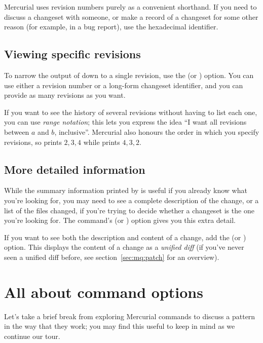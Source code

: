 Mercurial uses revision numbers purely as a convenient shorthand.  If
you need to discuss a changeset with someone, or make a record of a
changeset for some other reason (for example, in a bug report), use
the hexadecimal identifier.

\subsection{Viewing specific revisions}

To narrow the output of  down to a single revision, use the
 (or ) option.  You can use either a
revision number or a long-form changeset identifier, and you can
provide as many revisions as you want.  

If you want to see the history of several revisions without having to
list each one, you can use \emph{range notation}; this lets you
express the idea ``I want all revisions between $a$ and $b$,
inclusive''.
Mercurial also honours the order in which you specify revisions, so
 prints $2,3,4$ while 
prints $4,3,2$.

\subsection{More detailed information}

While the summary information printed by  is useful if you
already know what you're looking for, you may need to see a complete
description of the change, or a list of the files changed, if you're
trying to decide whether a changeset is the one you're looking for.
The  command's  (or )
option gives you this extra detail.

If you want to see both the description and content of a change, add
the  (or ) option.  This displays
the content of a change as a \emph{unified diff} (if you've never seen
a unified diff before, see section~\ref{sec:mq:patch} for an overview).

\section{All about command options}

Let's take a brief break from exploring Mercurial commands to discuss
a pattern in the way that they work; you may find this useful to keep
in mind as we continue our tour.

